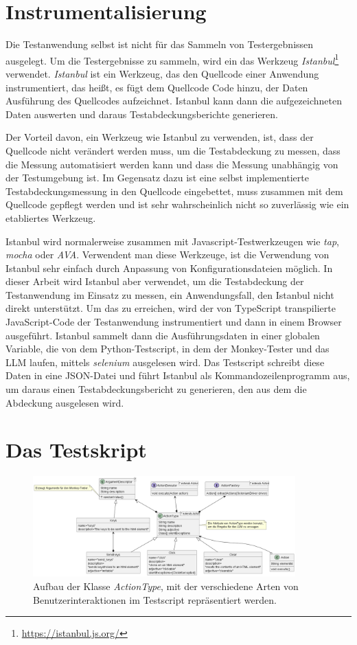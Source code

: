 \section{Instrumentalisierung}

Die Testanwendung selbst ist nicht für das Sammeln von Testergebnissen ausgelegt.
Um die Testergebnisse zu sammeln, wird ein das Werkzeug \textit{Istanbul}\footnote{\url{https://istanbul.js.org/}} verwendet.
\textit{Istanbul} ist ein Werkzeug, das den Quellcode einer Anwendung instrumentiert, das heißt, es fügt dem Quellcode Code hinzu, der Daten Ausführung des Quellcodes aufzeichnet.
Istanbul kann dann die aufgezeichneten Daten auswerten und daraus Testabdeckungsberichte generieren.

Der Vorteil davon, ein Werkzeug wie Istanbul zu verwenden, ist, dass der Quellcode nicht verändert werden muss, um die Testabdeckung zu messen, dass die Messung automatisiert werden kann und dass die Messung unabhängig von der Testumgebung ist.
Im Gegensatz dazu ist eine selbst implementierte Testabdeckungsmessung in den Quellcode eingebettet, muss zusammen mit dem Quellcode gepflegt werden und ist sehr wahrscheinlich nicht so zuverlässig wie ein etabliertes Werkzeug.

Istanbul wird normalerweise zusammen mit Javascript-Testwerkzeugen wie \textit{tap}, \textit{mocha} oder \textit{AVA}.
Verwendent man diese Werkzeuge, ist die Verwendung von Istanbul sehr einfach durch Anpassung von Konfigurationsdateien möglich.
In dieser Arbeit wird Istanbul aber verwendet, um die Testabdeckung der Testanwendung im Einsatz zu messen, ein Anwendungsfall, den Istanbul nicht direkt unterstützt.
Um das zu erreichen, wird der von TypeScript transpilierte JavaScript-Code der Testanwendung instrumentiert und dann in einem Browser ausgeführt.
Istanbul sammelt dann die Ausführungsdaten in einer globalen Variable, die von dem Python-Testscript, in dem der Monkey-Tester und das LLM laufen, mittels \textit{selenium} ausgelesen wird.
Das Testscript schreibt diese Daten in eine JSON-Datei und führt Istanbul als Kommandozeilenprogramm aus, um daraus einen Testabdeckungsbericht zu generieren, den aus dem die Abdeckung ausgelesen wird.

\section{Das Testskript}

\begin{figure}
    \centering
    \includegraphics[width=0.9\textwidth]{plantuml/ActionType.png}
    \caption{Aufbau der Klasse \textit{ActionType}, mit der verschiedene Arten von Benutzerinteraktionen im Testscript repräsentiert werden.}
    \label{fig:actiontype}
\end{figure}

